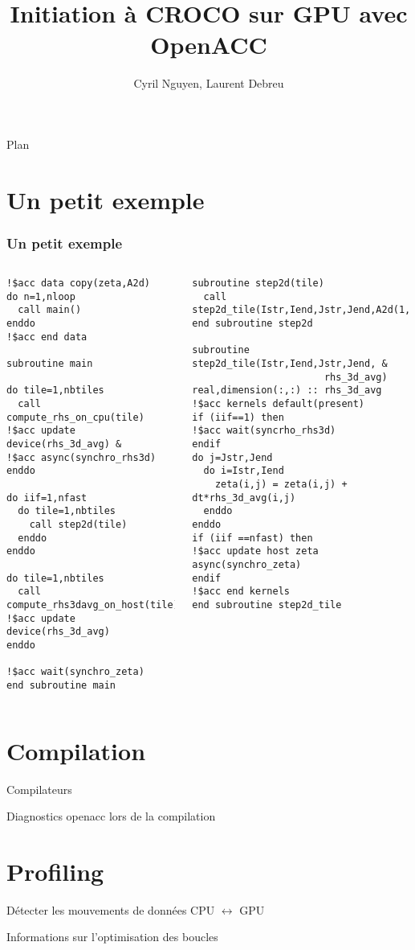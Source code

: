 \documentclass{beamer}
\title{Initiation à CROCO sur GPU avec OpenACC}
\author{Cyril Nguyen, Laurent Debreu}
\date{}
\begin{document}
\frame{\titlepage}
\begin{frame}{Plan}
	\tableofcontents
\end{frame}
\section{Un petit exemple}
\begin{frame}[fragile]
	\frametitle{Un petit exemple}
	\tiny
\begin{columns}
\begin{lstlisting}
!$acc data copy(zeta,A2d)
do n=1,nloop
  call main()
enddo
!$acc end data

subroutine main

do tile=1,nbtiles
  call compute_rhs_on_cpu(tile)
!$acc update device(rhs_3d_avg) &
!$acc async(synchro_rhs3d)
enddo

do iif=1,nfast
  do tile=1,nbtiles
    call step2d(tile)
  enddo
enddo

do tile=1,nbtiles
  call compute_rhs3davg_on_host(tile)
!$acc update device(rhs_3d_avg)
enddo

!$acc wait(synchro_zeta)
end subroutine main
\end{lstlisting}
\tiny
\begin{lstlisting}
subroutine step2d(tile)
  call step2d_tile(Istr,Iend,Jstr,Jend,A2d(1,1))
end subroutine step2d

subroutine step2d_tile(Istr,Iend,Jstr,Jend, &
                       rhs_3d_avg)
real,dimension(:,:) :: rhs_3d_avg
!$acc kernels default(present)
if (iif==1) then
!$acc wait(syncrho_rhs3d)
endif
do j=Jstr,Jend
  do i=Istr,Iend
    zeta(i,j) = zeta(i,j) + dt*rhs_3d_avg(i,j)
  enddo
enddo
if (iif ==nfast) then
!$acc update host zeta async(synchro_zeta)
endif
!$acc end kernels
end subroutine step2d_tile

\end{lstlisting}
\end{columns}
\end{frame}
\section{Compilation}
\begin{frame}{Compilateurs}
\end{frame}
\begin{frame}{Diagnostics openacc lors de la compilation}
\end{frame}
\section{Profiling}
\begin{frame}{Détecter les mouvements de données CPU $\leftrightarrow$ GPU}
\end{frame}
\begin{frame}{Informations sur l'optimisation des boucles}
\end{frame}
\end{document}
